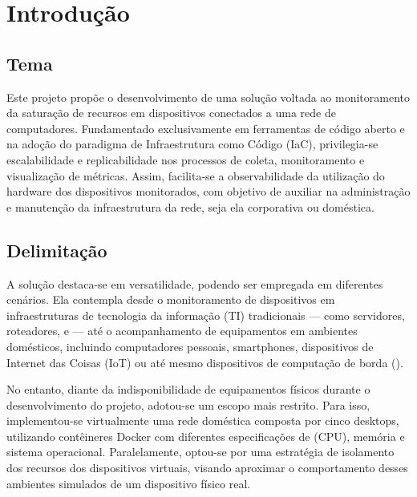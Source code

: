 \chapter{Introdução}
\label{chap1}

\section{Tema}
\label{section:Tema}

Este projeto propõe o desenvolvimento de uma solução voltada ao monitoramento da saturação de recursos em dispositivos conectados a uma rede de computadores. Fundamentado exclusivamente em ferramentas de código aberto e na adoção do paradigma de Infraestrutura como Código (IaC), privilegia-se escalabilidade e replicabilidade nos processos de coleta, monitoramento e visualização de métricas. Assim, facilita-se a observabilidade da utilização do hardware dos dispositivos monitorados, com objetivo de auxiliar na administração e manutenção da infraestrutura da rede, seja ela corporativa ou doméstica.

\section{Delimitação}
\label{section:Delimitação}

A solução destaca-se em versatilidade, podendo ser empregada em diferentes cenários. Ela contempla desde o monitoramento de dispositivos em infraestruturas de tecnologia da informação (TI) tradicionais --- como servidores, roteadores,  e  --- até o acompanhamento de equipamentos em ambientes domésticos, incluindo computadores pessoais, smartphones, dispositivos de Internet das Coisas (IoT) ou até mesmo dispositivos de computação de borda ().

No entanto, diante da indisponibilidade de equipamentos físicos durante o desenvolvimento do projeto, adotou-se um escopo mais restrito. Para isso, implementou-se virtualmente uma rede doméstica composta por cinco desktops, utilizando contêi\-neres Docker com diferentes especificações de  (CPU), memória e sistema operacional. Paralelamente, optou-se por uma estratégia de isolamento dos recursos dos dispositivos virtuais, visando aproximar o comportamento desses ambientes simulados de um dispositivo físico real.

